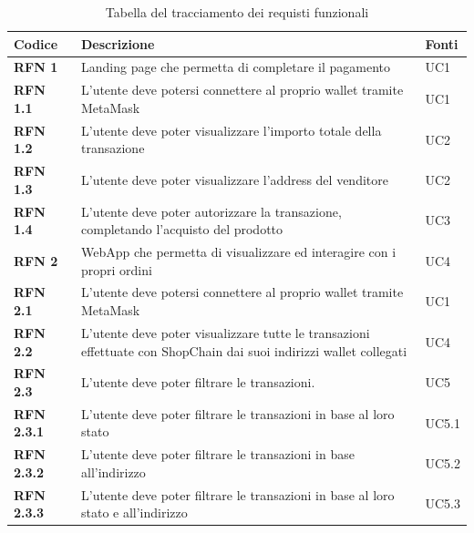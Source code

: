 \begin{longtable}[c]{|l|p{8.4cm}|l|}
\caption{Tabella del tracciamento dei requisti funzionali}
\label{tab:requisiti-funzionali}
\\ \hline
\rowcolor{gray!40}
\textbf{Codice} &
\textbf{Descrizione} &
\textbf{Fonti} \\ \hline
\endhead

\textbf{RFN 1} & Landing page che permetta di completare il pagamento & UC1 \\ \hline

\textbf{RFN 1.1} & L’utente deve potersi connettere al proprio wallet tramite MetaMask & UC1 \\ \hline

\textbf{RFN 1.2} & L’utente deve poter visualizzare l’importo totale della transazione & UC2 \\ \hline

\textbf{RFN 1.3} & L’utente deve poter visualizzare l’address del venditore & UC2 \\ \hline

\textbf{RFN 1.4} & L’utente deve poter autorizzare la transazione, completando l’acquisto del prodotto & UC3 \\ \hline

\textbf{RFN 2} & WebApp che permetta di visualizzare ed interagire con i propri ordini & UC4 \\ \hline

\textbf{RFN 2.1} & L’utente deve potersi connettere al proprio wallet tramite MetaMask & UC1 \\ \hline

\textbf{RFN 2.2} & L’utente deve poter visualizzare tutte le transazioni effettuate con ShopChain dai suoi indirizzi wallet collegati & UC4 \\ \hline

\textbf{RFN 2.3} & L’utente deve poter filtrare le transazioni. & UC5 \\ \hline

\textbf{RFN 2.3.1} & L’utente deve poter filtrare le transazioni in base al loro stato & UC5.1 \\ \hline

\textbf{RFN 2.3.2} & L’utente deve poter filtrare le transazioni in base all’indirizzo & UC5.2 \\ \hline

\textbf{RFN 2.3.3} & L’utente deve poter filtrare le transazioni in base al loro stato e all'indirizzo & UC5.3 \\ \hline


\end{longtable}
